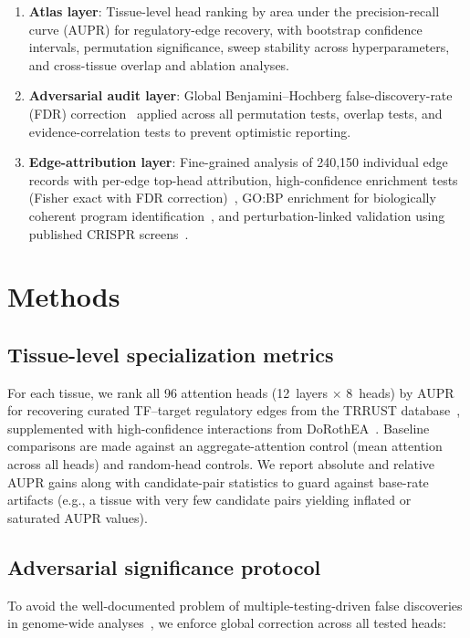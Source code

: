 \documentclass[11pt]{article}
\begin{document}
\begin{enumerate}
\item \textbf{Atlas layer}: Tissue-level head ranking by area under the precision-recall curve (AUPR) for regulatory-edge recovery, with bootstrap confidence intervals, permutation significance, sweep stability across hyperparameters, and cross-tissue overlap and ablation analyses.
\item \textbf{Adversarial audit layer}: Global Benjamini--Hochberg false-discovery-rate (FDR) correction~\cite{benjamini1995fdr} applied across all permutation tests, overlap tests, and evidence-correlation tests to prevent optimistic reporting.
\item \textbf{Edge-attribution layer}: Fine-grained analysis of 240,150 individual edge records with per-edge top-head attribution, high-confidence enrichment tests (Fisher exact with FDR correction)~\cite{fisher1922}, GO:BP enrichment for biologically coherent program identification~\cite{kolberg2020gprofiler2,ashburner2000go}, and perturbation-linked validation using published CRISPR screens~\cite{dixit2016perturb,adamson2016multiplexed}.
\end{enumerate}


\section{Methods}

\subsection{Tissue-level specialization metrics}
For each tissue, we rank all 96 attention heads (12~layers $\times$ 8~heads) by AUPR for recovering curated TF--target regulatory edges from the TRRUST database~\cite{han2018trrust}, supplemented with high-confidence interactions from DoRothEA~\cite{garcia2019dorothea}. Baseline comparisons are made against an aggregate-attention control (mean attention across all heads) and random-head controls. We report absolute and relative AUPR gains along with candidate-pair statistics to guard against base-rate artifacts (e.g., a tissue with very few candidate pairs yielding inflated or saturated AUPR values).

\subsection{Adversarial significance protocol}
To avoid the well-documented problem of multiple-testing-driven false discoveries in genome-wide analyses~\cite{storey2003significance,benjamini1995fdr}, we enforce global correction across all tested heads:
\end{document}
